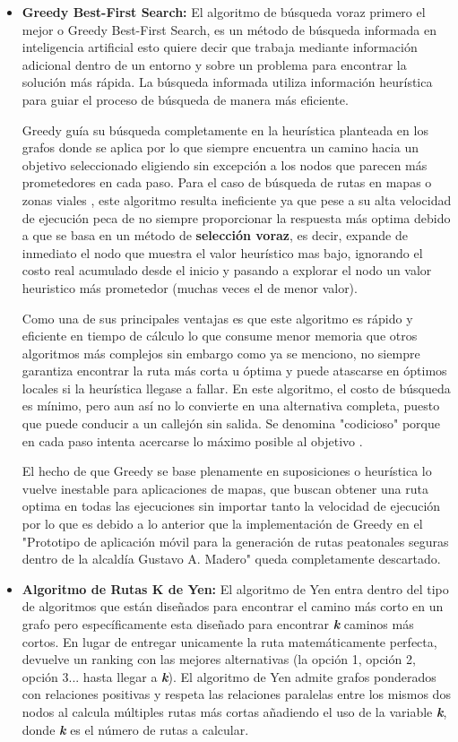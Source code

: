 \begin{itemize}
    \item \textbf{Greedy Best-First Search:} El algoritmo de búsqueda voraz primero el mejor o Greedy Best-First Search, es un método de búsqueda informada en inteligencia artificial esto quiere decir que trabaja mediante información adicional dentro de un entorno y sobre un problema para encontrar la solución más rápida. La búsqueda informada utiliza información heurística para guiar el proceso de búsqueda de manera más eficiente. 

    Greedy guía su búsqueda completamente en la heurística planteada en los grafos donde se aplica por lo que siempre encuentra un camino hacia un objetivo seleccionado eligiendo sin excepción a los nodos que parecen más prometedores en cada paso. Para el caso de búsqueda de rutas en mapas o zonas viales , este algoritmo resulta ineficiente ya que pese a su alta velocidad de ejecución peca de no siempre proporcionar la respuesta más optima debido a que se basa en un método de \textbf{selección voraz}, es decir, expande de inmediato el nodo que muestra el valor heurístico mas bajo, ignorando el costo real acumulado desde el inicio y pasando a explorar el nodo un valor heuristico más prometedor (muchas veces el de menor valor). 

    Como una de sus principales ventajas es que este algoritmo es rápido y eficiente en tiempo de cálculo lo que consume menor memoria que otros algoritmos más complejos sin embargo como ya se menciono, no siempre garantiza encontrar la ruta más corta u óptima y puede atascarse en óptimos locales si la heurística llegase a fallar. En este algoritmo, el costo de búsqueda es mínimo, pero aun así no lo convierte en una alternativa completa, puesto que puede conducir a un callejón sin salida. Se denomina "codicioso" porque en cada paso intenta acercarse lo máximo posible al objetivo \cite{greedy_voraz}.
    
    El hecho de que Greedy se base plenamente en suposiciones o heurística lo vuelve inestable para aplicaciones de mapas, que buscan obtener una ruta optima en todas las ejecuciones sin importar tanto la velocidad de ejecución por lo que es debido a lo anterior que la implementación de Greedy en el "Prototipo de aplicación móvil para la generación de rutas peatonales seguras dentro de la alcaldía Gustavo A. Madero" queda completamente descartado. 

    \item \textbf{Algoritmo de Rutas K de Yen:} El algoritmo de Yen entra dentro del tipo de algoritmos que están diseñados para encontrar el camino más corto en un grafo pero específicamente esta diseñado para encontrar \textbf{\textit{k}} caminos más cortos. En lugar de entregar unicamente la ruta matemáticamente perfecta, devuelve un ranking con las mejores alternativas (la opción 1, opción 2, opción 3... hasta llegar a \textbf{\textit{k}}). El algoritmo de Yen admite grafos ponderados con relaciones positivas y respeta las relaciones paralelas entre los mismos dos nodos al calcula múltiples rutas más cortas añadiendo el uso de la variable \textbf{\textit{k}}, donde \textbf{\textit{k}} es el número de rutas a calcular.  


\end{itemize}
